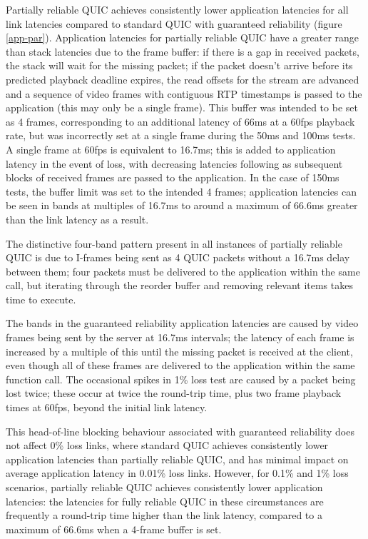 \documentclass{mpaper}
\begin{document}
Partially reliable QUIC achieves consistently lower application latencies for all link latencies compared to standard QUIC with guaranteed reliability (figure \ref{app-par}). Application latencies for partially reliable QUIC have a greater range than stack latencies due to the frame buffer: if there is a gap in received packets, the stack will wait for the missing packet; if the packet doesn't arrive before its predicted playback deadline expires, the read offsets for the stream are advanced and a sequence of video frames with contiguous RTP timestamps is passed to the application (this may only be a single frame). This buffer was intended to be set as 4 frames, corresponding to an additional latency of 66ms at a 60fps playback rate, but was incorrectly set at a single frame during the 50ms and 100ms tests. A single frame at 60fps is equivalent to 16.7ms; this is added to application latency in the event of loss, with decreasing latencies following as subsequent blocks of received frames are passed to the application. In the case of 150ms tests, the buffer limit was set to the intended 4 frames; application latencies can be seen in bands at multiples of 16.7ms to around a maximum of 66.6ms greater than the link latency as a result.

The distinctive four-band pattern present in all instances of partially reliable QUIC is due to I-frames being sent as 4 QUIC packets without a 16.7ms delay between them; four packets must be delivered to the application within the same call, but iterating through the reorder buffer and removing relevant items takes time to execute.

The bands in the guaranteed reliability application latencies are caused by video frames being sent by the server at 16.7ms intervals; the latency of each frame is increased by a multiple of this until the missing packet is received at the client, even though all of these frames are delivered to the application within the same function call. The occasional spikes in 1\% loss test are caused by a packet being lost twice; these occur at twice the round-trip time, plus two frame playback times at 60fps, beyond the initial link latency.

This head-of-line blocking behaviour associated with guaranteed reliability does not affect 0\% loss links, where standard QUIC achieves consistently lower application latencies than partially reliable QUIC, and has minimal impact on average application latency in 0.01\% loss links. However, for 0.1\% and 1\% loss scenarios, partially reliable QUIC achieves consistently lower application latencies: the latencies for fully reliable QUIC in these circumstances are frequently a round-trip time higher than the link latency, compared to a maximum of 66.6ms when a 4-frame buffer is set.
\end{document}
